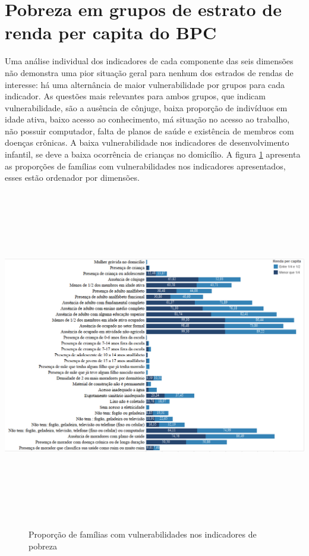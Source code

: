 \documentclass[
	12pt,				%
	openright,			%
	twoside,			%
	a4paper,			%
	english,			%
	french,				%
	spanish,			%
	brazil				%
	]{abntex2}
\begin{document}
\section{Pobreza em grupos de estrato de renda per capita do BPC}

Uma análise individual dos indicadores de cada componente das seis dimensões não demonstra uma pior situação geral para nenhum dos estrados de rendas de interesse: há uma alternância de maior vulnerabilidade por grupos para cada indicador.  As questões mais relevantes para ambos grupos, que indicam vulnerabilidade,  são a ausência de cônjuge, baixa proporção de indivíduos em idade ativa,  baixo acesso ao conhecimento, má situação no acesso ao trabalho, não possuir computador, falta de planos de saúde e existência de membros com doenças crônicas. A baixa vulnerabilidade nos indicadores de desenvolvimento infantil, se deve a baixa ocorrência de crianças no domicílio.  A figura \ref{ind_resumo_figura} apresenta as proporções de famílias com vulnerabilidades nos indicadores apresentados, esses estão ordenador por dimensões. 

\begin{landscape}
\begin{center}
	\includegraphics[width= 23cm, height=14.5cm ]{resumo_indicadores.png}
	\begin{figure}[!h]
		\caption{Proporção de famílias com vulnerabilidades nos indicadores de pobreza}
		\label{ind_resumo_figura}
	\end{figure}
\end{center}
\end{landscape}
\end{document}
